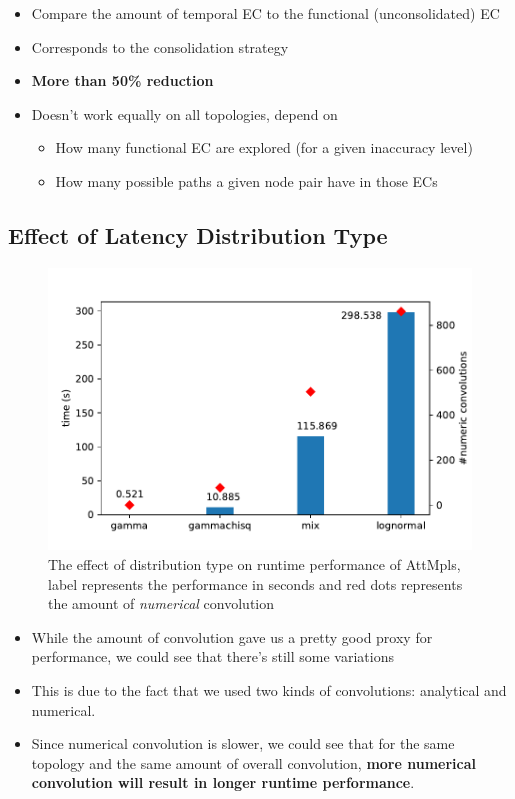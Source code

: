 \documentclass[10pt,sigconf,letterpaper,anonymous,nonacm]{acmart}
\begin{document}
\begin{itemize}
    \item Compare the amount of temporal EC to the functional (unconsolidated) EC
    \item Corresponds to the consolidation strategy
    \item \textbf{More than 50\% reduction}
    \item Doesn't work equally on all topologies, depend on 
    \begin{itemize}
        \item How many functional EC are explored (for a given inaccuracy level)
        \item How many possible paths a given node pair have in those ECs
    \end{itemize}
\end{itemize}

\subsection{Effect of Latency Distribution Type}

\begin{figure}[h]
    \centering
    \includegraphics[scale=0.5]{distribution}
    \caption{The effect of distribution type on runtime performance of AttMpls, label represents the 
    performance in seconds and red dots represents the amount of \textit{numerical} convolution}
    \label{fig:dist}
\end{figure}

\begin{itemize}
    \item While the amount of convolution gave us a pretty good proxy for performance, we could see 
        that there's still some variations
    \item This is due to the fact that we used two kinds of convolutions: analytical and numerical.
    \item Since numerical convolution is slower, we could see that for the same topology and the same amount of 
        overall convolution, \textbf{more numerical convolution will result in longer runtime performance}.
\end{itemize}
\end{document}
